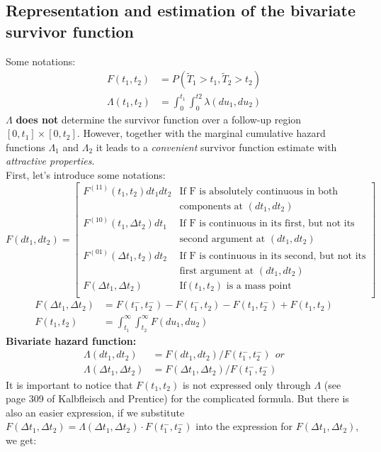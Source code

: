 \documentclass[]{article}
\begin{document}
\subsection{Representation and estimation of the bivariate survivor function}
Some notations:
	$$
	\begin{aligned}
		F(t_1,t_2) &= P(\tilde{T}_1>t_1,\tilde{T}_2 > t_2)\\
		\Lambda(t_1,t_2) &= \int_0^{t_1} \int_0^{t2} \lambda(du_1, du_2)
	\end{aligned}
	$$
$\Lambda$ \textbf{does not} determine the survivor function over a follow-up region $[0,t_1] \times [0,t_2]$. However, together with the marginal cumulative hazard functions $\Lambda_1$ and $\Lambda_2$ it leads to a \emph{convenient} survivor function estimate with \emph{attractive properties}.\\
First, let's introduce some notations:
\[
F(dt_1, dt_2)=
\begin{bmatrix}
    F^{(11)}(t_1, t_2)dt_1 dt_2 & \text{If F is absolutely continuous in both} \\
        & \text{components at }(dt_1, dt_2) \\
    F^{(10)}(t_1, \Delta t_2)dt_1 & \text{If F is continuous in its first, but not its }\\
        & \text{second argument at }(dt_1, dt_2) \\
    F^{(01)}(\Delta t_1, t_2)dt_2 & \text{If F is continuous in its second, but not its} \\
        & \text{first argument at }(dt_1, dt_2) \\
    F(\Delta t_1, \Delta t_2) & \text{If} (t_1, t_2)\text{ is a mass point}\\
\end{bmatrix}
\]
	$$
	\begin{aligned}
		F(\Delta t_1, \Delta t_2) &= F(t_1^-, t_2^-) - F(t_1^-, t_2) - F(t_1, t_2^-) + F(t_1, t_2)\\
		F(t_1, t_2) &= \int_{t_1}^{\infty} \int_{t_2}^{\infty} F(du_1, du_2)
	\end{aligned}
	$$
\textbf{Bivariate hazard function:}
	$$
	\begin{aligned}
		\Lambda(dt_1, dt_2) &= F(dt_1, dt_2)/F(t_1^-, t_2^-) ~~or\\
		\Lambda(\Delta t_1, \Delta t_2) &= F(\Delta t_1, \Delta t_2)/F(t_1^-, t_2^-)
	\end{aligned}
	$$
It is important to notice that $F(t_1,t_2)$ is not expressed only through $\Lambda$ (see page 309 of Kalbfleisch and Prentice) for the complicated formula. But there is also an easier expression, if we substitute $F(\Delta t_1, \Delta t_2) = \Lambda(\Delta t_1, \Delta t_2) \cdot F(t_1^-, t_2^-)$ into the expression for $F(\Delta t_1, \Delta t_2)$, we get:
\end{document}

